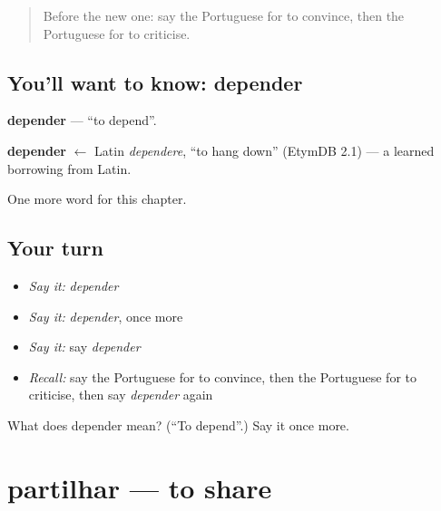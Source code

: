 \label{lesson:PT-C234-depender}



\begin{quote}
Before the new one: say the Portuguese for to convince, then the Portuguese for to criticise.
\end{quote}

\subsection*{You'll want to know: depender}
\textbf{depender} — \textquotedblleft{}to depend\textquotedblright{}.

\begin{cousinweb}
\textbf{depender} $\leftarrow$ Latin \emph{dependere}, \textquotedblleft{}to hang down\textquotedblright{} (EtymDB 2.1) — a learned borrowing from Latin.
\end{cousinweb}

\begin{grammarlens}[title={What you've built}]
One more word for this chapter.
\end{grammarlens}

\subsection*{Your turn}
\begin{itemize}
\raggedright
  \item \emph{Say it:} \emph{depender}
  \item \emph{Say it:} \emph{depender}, once more
  \item \emph{Say it:} say \emph{depender}
  \item \emph{Recall:} say the Portuguese for to convince, then the Portuguese for to criticise, then say \emph{depender} again
\end{itemize}

\begin{tcolorbox}[breakable,colback=teal!4,colframe=teal!35!black,title={Before you move on}]
What does depender mean? (\textquotedblleft{}To depend\textquotedblright{}.) Say it once more.
\end{tcolorbox}
\section[partilhar]{partilhar — to share}

\label{lesson:PT-C234-partilhar}



